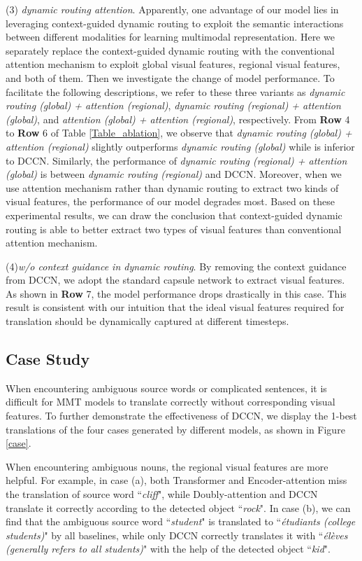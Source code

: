 \documentclass[sigconf]{acmart}
\begin{document}
(3) \emph{dynamic routing  attention}. 
Apparently, one advantage of our model lies in leveraging context-guided dynamic routing to exploit the semantic interactions between different modalities for learning multimodal representation. Here we separately replace the context-guided dynamic routing with the conventional attention mechanism to exploit global visual features, regional visual features, and both of them. Then we investigate the change of model performance. 
To facilitate the following descriptions, we refer to these three variants as 
\emph{dynamic routing (global) + attention (regional)}, 
\emph{dynamic routing (regional) + attention (global)}, 
and \emph{attention (global) + attention (regional)}, respectively. 
From \textbf{Row} 4 to \textbf{Row} 6 of Table \ref{Table_ablation}, 
we observe that \emph{dynamic routing (global) + attention (regional)} slightly outperforms \emph{dynamic routing (global)} while is inferior to DCCN. 
Similarly, the performance of \emph{dynamic routing (regional) + attention (global)} is between \emph{dynamic routing (regional)} and DCCN. 
Moreover, when we use attention mechanism rather than dynamic routing to extract two kinds of visual features, the performance of our model degrades most. 
Based on these experimental results, we can draw the conclusion that context-guided dynamic routing is able to better extract two types of visual features than conventional attention mechanism.


(4)\emph{w/o context guidance in dynamic routing}.
By removing the context guidance from DCCN, we adopt the standard capsule network to extract visual features. 
As shown in \textbf{Row} 7, 
the model performance drops drastically in this case.
This result is consistent with our intuition that the ideal visual features required for translation should be dynamically captured at different timesteps. 




\subsection{Case Study}


When encountering ambiguous source words or complicated sentences, it is difficult for MMT models to translate correctly without corresponding visual features. To further demonstrate the effectiveness of DCCN, we display the 1-best translations of the four cases generated by different models, as shown in Figure \ref{case}.

When encountering ambiguous nouns, the regional visual features are more helpful. For example, in case (a), both Transformer and Encoder-attention miss the translation of source word ``\emph{cliff}", while Doubly-attention and DCCN translate it correctly according to the detected object ``\emph{rock}".
In case (b), we can find that the ambiguous source word ``\emph{student}" is translated to ``\emph{étudiants (college students)}" by all baselines, while only DCCN correctly translates it with ``\emph{élèves (generally refers to all students)}" with the help of the detected object ``\emph{kid}". 
\end{document}
